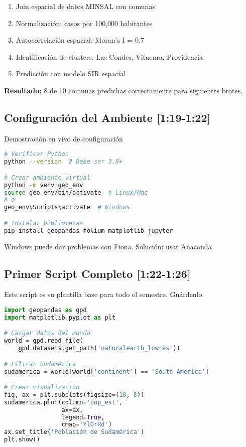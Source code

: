 \documentclass[11pt,a4paper]{article}
\newcommand{\tiempo}[1]{\textcolor{timecolor}{\textbf{[#1]}}}
\newcommand{\decir}[1]{\begin{tcolorbox}[colback=blue!5,colframe=usachblue,title={DECIR}]#1\end{tcolorbox}}
\newcommand{\hacer}[1]{\begin{tcolorbox}[colback=green!5,colframe=green!50!black,title={HACER}]#1\end{tcolorbox}}
\newcommand{\alerta}[1]{\begin{tcolorbox}[colback=red!5,colframe=red,title={ALERTA}]#1\end{tcolorbox}}
\begin{document}
\begin{enumerate}
    \item Join espacial de datos MINSAL con comunas
    \item Normalización: casos por 100,000 habitantes
    \item Autocorrelación espacial: Moran's I = 0.7
    \item Identificación de clusters: Las Condes, Vitacura, Providencia
    \item Predicción con modelo SIR espacial
\end{enumerate}

\textbf{Resultado:} 8 de 10 comunas predichas correctamente para siguientes brotes.

\subsection{Configuración del Ambiente \tiempo{1:19-1:22}}

\hacer{Demostración en vivo de configuración}

\begin{lstlisting}[language=bash]
# Verificar Python
python --version  # Debe ser 3.8+

# Crear ambiente virtual
python -m venv geo_env
source geo_env/bin/activate  # Linux/Mac
# o
geo_env\Scripts\activate  # Windows

# Instalar bibliotecas
pip install geopandas folium matplotlib jupyter
\end{lstlisting}

\alerta{Windows puede dar problemas con Fiona. Solución: usar Anaconda}

\subsection{Primer Script Completo \tiempo{1:22-1:26}}

\decir{Este script es su plantilla base para todo el semestre. Guárdenlo.}

\begin{lstlisting}[language=Python]
import geopandas as gpd
import matplotlib.pyplot as plt

# Cargar datos del mundo
world = gpd.read_file(
    gpd.datasets.get_path('naturalearth_lowres'))

# Filtrar Sudamérica
sudamerica = world[world['continent'] == 'South America']

# Crear visualización
fig, ax = plt.subplots(figsize=(10, 8))
sudamerica.plot(column='pop_est', 
                ax=ax,
                legend=True,
                cmap='YlOrRd')
ax.set_title('Población de Sudamérica')
plt.show()
\end{lstlisting}
\end{document}
